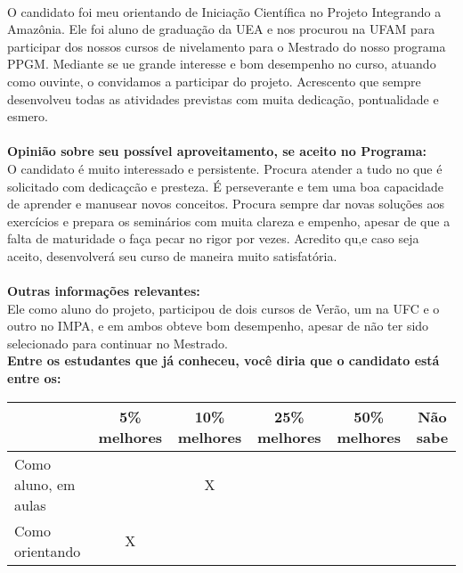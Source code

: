 \documentclass[11pt]{article}
\begin{document}
\\O candidato foi meu orientando de Iniciação Científica no Projeto Integrando a Amazônia. Ele foi aluno de graduação da UEA e nos procurou na UFAM para participar dos nossos cursos de nivelamento para o Mestrado do nosso programa PPGM. Mediante se ue grande interesse e bom desempenho no curso, atuando como ouvinte, o convidamos a participar do projeto. Acrescento que sempre desenvolveu todas as atividades previstas com muita dedicação, pontualidade e esmero.\\
\\
\textbf{Opinião sobre seu possível aproveitamento, se aceito no Programa:}
\\O candidato é muito interessado e persistente. Procura atender a tudo no que é solicitado com dedicaçcão e presteza. É perseverante e tem uma boa capacidade de aprender e manusear novos conceitos. Procura sempre dar novas soluções aos exercícios e prepara os seminários com muita clareza e empenho, apesar de que a falta de maturidade o faça pecar no rigor por vezes. Acredito qu,e caso seja aceito, desenvolverá seu curso de maneira muito satisfatória. \\ 
\\
\textbf{Outras informações relevantes:} \\Ele como aluno do projeto, participou de dois cursos de Verão, um na UFC e o outro no IMPA, e em ambos obteve bom desempenho, apesar de não ter sido selecionado para continuar no Mestrado.
\\[0.3cm]
\textbf{Entre os estudantes que já conheceu, você diria que o candidato está entre os:}
\\
\begin{tabular}{|l|c|c|c|c|c|}
\hline
 & 5\% melhores & 10\% melhores & 25\% melhores & 50\% melhores & Não sabe \\
\hline
Como aluno, em aulas &  & X &  &  & \\
\hline
Como orientando & X &  &  &  & \\
\hline
\end{tabular}
\end{document}
